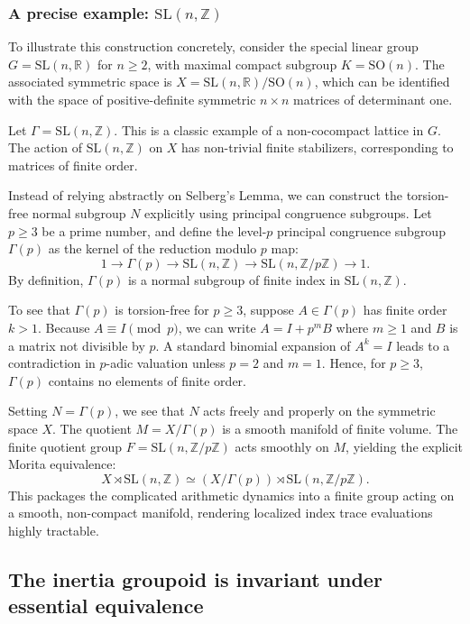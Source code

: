 \documentclass[a4paper]{amsart}
\newcommand\<{\langle}
\renewcommand\>{\rangle}
\theoremstyle{definition}
\theoremstyle{remark}
\begin{document}
\subsubsection{A precise example: $\mathrm{SL}(n, \mathbb{Z})$}

To illustrate this construction concretely, consider the special linear group $G = \mathrm{SL}(n, \mathbb{R})$ for $n \ge 2$,
with maximal compact subgroup $K = \mathrm{SO}(n)$.
The associated symmetric space is $X = \mathrm{SL}(n, \mathbb{R})/\mathrm{SO}(n)$,
which can be identified with the space of positive-definite symmetric $n \times n$ matrices of determinant one.

Let $\Gamma = \mathrm{SL}(n, \mathbb{Z})$. This is a classic example of a non-cocompact lattice in $G$.
The action of $\mathrm{SL}(n, \mathbb{Z})$ on $X$ has non-trivial finite stabilizers, corresponding to matrices of finite order.

Instead of relying abstractly on Selberg's Lemma,
we can construct the torsion-free normal subgroup $N$ explicitly using principal congruence subgroups.
Let $p \ge 3$ be a prime number, and define the level-$p$ principal congruence subgroup $\Gamma(p)$
as the kernel of the reduction modulo $p$ map:
$$ 1 \to \Gamma(p) \to \mathrm{SL}(n, \mathbb{Z}) \to \mathrm{SL}(n, \mathbb{Z}/p\mathbb{Z}) \to 1 .$$
By definition, $\Gamma(p)$ is a normal subgroup of finite index in $\mathrm{SL}(n, \mathbb{Z})$.

To see that $\Gamma(p)$ is torsion-free for $p \ge 3$,
suppose $A \in \Gamma(p)$ has finite order $k > 1$. Because $A \equiv I \pmod{p}$,
we can write $A = I + p^m B$ where $m \ge 1$ and $B$ is a matrix not divisible by $p$.
A standard binomial expansion of $A^k = I$ leads to a contradiction in $p$-adic valuation unless $p=2$ and $m=1$.
Hence, for $p \ge 3$, $\Gamma(p)$ contains no elements of finite order.

Setting $N = \Gamma(p)$, we see that $N$ acts freely and properly on the symmetric space $X$.
The quotient $M = X/\Gamma(p)$ is a smooth manifold of finite volume.
The finite quotient group $F = \mathrm{SL}(n, \mathbb{Z}/p\mathbb{Z})$ acts smoothly on $M$, yielding the explicit Morita equivalence:
$$ X \rtimes \mathrm{SL}(n, \mathbb{Z}) \simeq (X/\Gamma(p)) \rtimes \mathrm{SL}(n, \mathbb{Z}/p\mathbb{Z}) .$$
This packages the complicated arithmetic dynamics into a finite group acting on a smooth,
non-compact manifold, rendering localized index trace evaluations highly tractable.


\subsection{The inertia groupoid is invariant under essential equivalence}
\end{document}
